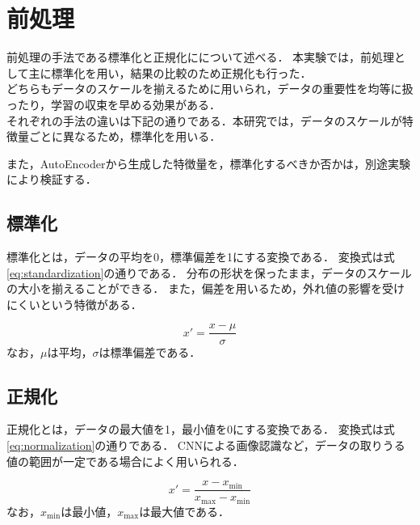 \section{前処理}
前処理の手法である標準化と正規化にについて述べる．
本実験では，前処理として主に標準化を用い，結果の比較のため正規化も行った．\\
どちらもデータのスケールを揃えるために用いられ，データの重要性を均等に扱ったり，学習の収束を早める効果がある．\\
それぞれの手法の違いは下記の通りである．本研究では，データのスケールが特徴量ごとに異なるため，標準化を用いる．

また，AutoEncoderから生成した特徴量を，標準化するべきか否かは，別途実験により検証する．

\subsection{標準化}

標準化とは，データの平均を0，標準偏差を1にする変換である．
変換式は式\ref{eq:standardization}の通りである．
分布の形状を保ったまま，データのスケールの大小を揃えることができる．
また，偏差を用いるため，外れ値の影響を受けにくいという特徴がある．

\begin{equation}
  \label{eq:standardization}
  x' = \frac{x - \mu}{\sigma}
\end{equation}
なお，$\mu$は平均，$\sigma$は標準偏差である．

\subsection{正規化}

正規化とは，データの最大値を1，最小値を0にする変換である．
変換式は式\ref{eq:normalization}の通りである．
CNNによる画像認識など，データの取りうる値の範囲が一定である場合によく用いられる．

\begin{equation}
  \label{eq:normalization}
  x' = \frac{x - x_{\min}}{x_{\max} - x_{\min}}
\end{equation}
なお，$x_{\min}$は最小値，$x_{\max}$は最大値である．


